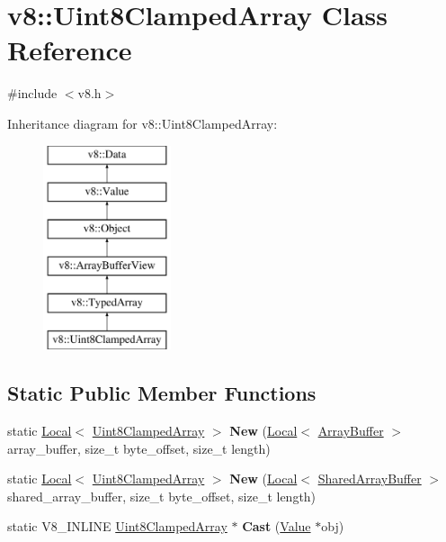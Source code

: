 \hypertarget{classv8_1_1Uint8ClampedArray}{}\section{v8\+:\+:Uint8\+Clamped\+Array Class Reference}
\label{classv8_1_1Uint8ClampedArray}


{\ttfamily \#include $<$v8.\+h$>$}

Inheritance diagram for v8\+:\+:Uint8\+Clamped\+Array\+:\begin{figure}[H]
\begin{center}
\leavevmode
\includegraphics[height=6.000000cm]{classv8_1_1Uint8ClampedArray}
\end{center}
\end{figure}
\subsection*{Static Public Member Functions}
\begin{DoxyCompactItemize}
\item 
\hypertarget{classv8_1_1Uint8ClampedArray_abadcd9c3c77b071e21f3140e0ed4411f}{}static \hyperlink{classv8_1_1Local}{Local}$<$ \hyperlink{classv8_1_1Uint8ClampedArray}{Uint8\+Clamped\+Array} $>$ {\bfseries New} (\hyperlink{classv8_1_1Local}{Local}$<$ \hyperlink{classv8_1_1ArrayBuffer}{Array\+Buffer} $>$ array\+\_\+buffer, size\+\_\+t byte\+\_\+offset, size\+\_\+t length)\label{classv8_1_1Uint8ClampedArray_abadcd9c3c77b071e21f3140e0ed4411f}

\item 
\hypertarget{classv8_1_1Uint8ClampedArray_a4f42e014ea0d35b33b6160bab223b4e3}{}static \hyperlink{classv8_1_1Local}{Local}$<$ \hyperlink{classv8_1_1Uint8ClampedArray}{Uint8\+Clamped\+Array} $>$ {\bfseries New} (\hyperlink{classv8_1_1Local}{Local}$<$ \hyperlink{classv8_1_1SharedArrayBuffer}{Shared\+Array\+Buffer} $>$ shared\+\_\+array\+\_\+buffer, size\+\_\+t byte\+\_\+offset, size\+\_\+t length)\label{classv8_1_1Uint8ClampedArray_a4f42e014ea0d35b33b6160bab223b4e3}

\item 
\hypertarget{classv8_1_1Uint8ClampedArray_aa1358e0ac24e305af5c90ba71b73fa7c}{}static V8\+\_\+\+I\+N\+L\+I\+N\+E \hyperlink{classv8_1_1Uint8ClampedArray}{Uint8\+Clamped\+Array} $\ast$ {\bfseries Cast} (\hyperlink{classv8_1_1Value}{Value} $\ast$obj)\label{classv8_1_1Uint8ClampedArray_aa1358e0ac24e305af5c90ba71b73fa7c}

\end{DoxyCompactItemize}
